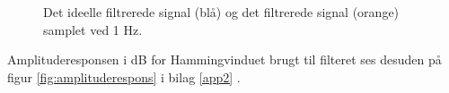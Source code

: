 \begin{figure}[H]
\begin{minipage}{0.49\textwidth}
\caption{Det ideelle filtrerede signal (blå) og det filtrerede signal (orange) samplet ved 1 Hz.}
\label{fig:resultat_signal}
\end{minipage}
\end{figure}

Amplituderesponsen i dB for Hammingvinduet brugt til filteret ses desuden på figur \ref{fig:amplituderespons} i bilag \ref{app2} .